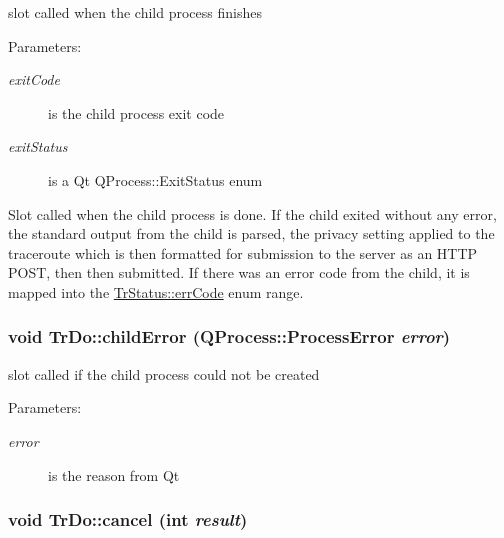 slot called when the child process finishes \begin{Desc}
\item[Parameters:]
\begin{description}
\item[{\em exitCode}]is the child process exit code \item[{\em exitStatus}]is a Qt QProcess::ExitStatus enum\end{description}
\end{Desc}
Slot called when the child process is done. If the child exited without any error, the standard output from the child is parsed, the privacy setting applied to the traceroute which is then formatted for submission to the server as an HTTP POST, then then submitted. If there was an error code from the child, it is mapped into the \hyperlink{classTrStatus_366057e7e0cc467a592518e5f0da5302}{TrStatus::errCode} enum range. \hypertarget{classTrDo_f2fb422e879258efaca94280f849b3dc}{
\subsubsection[childError]{\setlength{\rightskip}{0pt plus 5cm}void TrDo::childError (QProcess::ProcessError {\em error})}}
\label{classTrDo_f2fb422e879258efaca94280f849b3dc}


slot called if the child process could not be created \begin{Desc}
\item[Parameters:]
\begin{description}
\item[{\em error}]is the reason from Qt \end{description}
\end{Desc}
\hypertarget{classTrDo_f4e4e8f6848183014a157605bc9c402a}{
\subsubsection[cancel]{\setlength{\rightskip}{0pt plus 5cm}void TrDo::cancel (int {\em result})}}
\label{classTrDo_f4e4e8f6848183014a157605bc9c402a}


